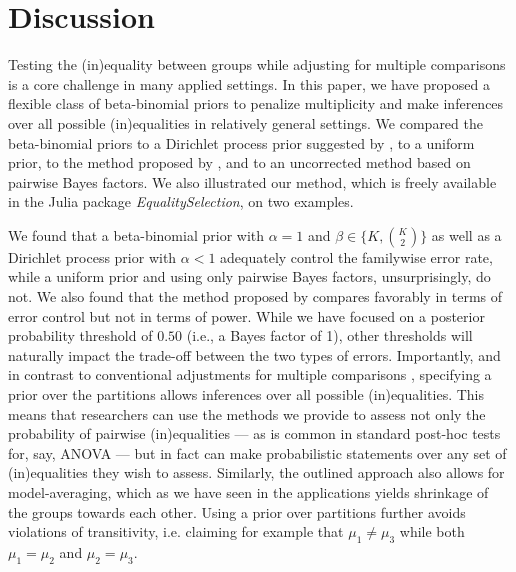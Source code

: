 \documentclass[11pt,a4paper]{article}
\theoremstyle{definition} %
\theoremstyle{case}
\begin{document}

\section{Discussion} \label{sec:discussion}

Testing the (in)equality between groups while adjusting for multiple comparisons is a core challenge in many applied settings. In this paper, we have proposed a flexible class of beta-binomial priors to penalize multiplicity and make inferences over all possible (in)equalities in relatively general settings. We compared the beta-binomial priors to a Dirichlet process prior suggested by \textcite{gopalan1998bayesian}, to a uniform prior, to the method proposed by \textcite{westfall1997bayesian}, and to an uncorrected method based on pairwise Bayes factors. We also illustrated our method, which is freely available in the Julia package \textit{EqualitySelection}, on two examples.

We found that a beta-binomial prior with $\alpha = 1$ and $\beta \in \{K, {K \choose 2}\}$ as well as a Dirichlet process prior with $\alpha < 1$ adequately control the familywise error rate, while a uniform prior and using only pairwise Bayes factors, unsurprisingly, do not. We also found that the method proposed by \textcite{westfall1997bayesian} compares favorably in terms of error control but not in terms of power. While we have focused on a posterior probability threshold of $0.50$ (i.e., a Bayes factor of 1), other thresholds will naturally impact the trade-off between the two types of errors. Importantly, and in contrast to conventional adjustments for multiple comparisons \parencite[e.g.,][]{westfall1997bayesian, jeffreys1961theory}, specifying a prior over the partitions allows inferences over all possible (in)equalities. This means that researchers can use the methods we provide to assess not only the probability of pairwise (in)equalities --- as is common in standard post-hoc tests for, say, ANOVA --- but in fact can make probabilistic statements over any set of (in)equalities they wish to assess. Similarly, the outlined approach also allows for model-averaging, which as we have seen in the applications yields shrinkage of the groups towards each other. Using a prior over partitions further avoids violations of transitivity, i.e. claiming for example that $\mu_1 \neq \mu_3$ while both $\mu_1 = \mu_2$ and $\mu_2 = \mu_3$.
\end{document}
